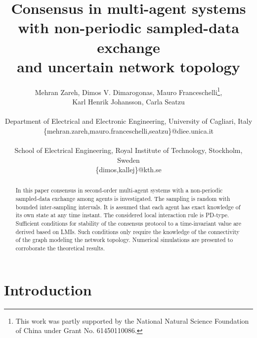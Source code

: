 \documentclass[conference]{IEEEtran}
\begin{document}
\title{Consensus in multi-agent systems \\ with non-periodic sampled-data exchange \\ and uncertain network topology}

\author{Mehran Zareh, Dimos V. Dimarogonas, Mauro Franceschelli\thanks{This work was partly supported by the National Natural Science Foundation of China under Grant No. 61450110086.},\\ Karl Henrik Johansson, Carla Seatzu
\\~\\
 Department of Electrical and Electronic Engineering, University of Cagliari, Italy \\
\{mehran.zareh,mauro.franceschelli,seatzu\}@diee.unica.it \\~\\
 School of Electrical Engineering, Royal Institute of Technology, Stockholm, Sweden \\ \{dimos,kallej\}@kth.se}
\maketitle






\begin{abstract} In this paper consensus in second-order multi-agent
systems with a non-periodic sampled-data exchange among agents is investigated. The sampling is random with bounded inter-sampling intervals. It is assumed that each agent has exact knowledge of its own state at any time instant. The considered local interaction rule is PD-type. Sufficient conditions for stability of the consensus protocol to a time-invariant value are derived based on LMIs. Such conditions only require the knowledge of the connectivity of the graph modeling the network topology. Numerical simulations are presented to corroborate the theoretical results.
\end{abstract}

\IEEEpeerreviewmaketitle

\section{Introduction}
\end{document}
